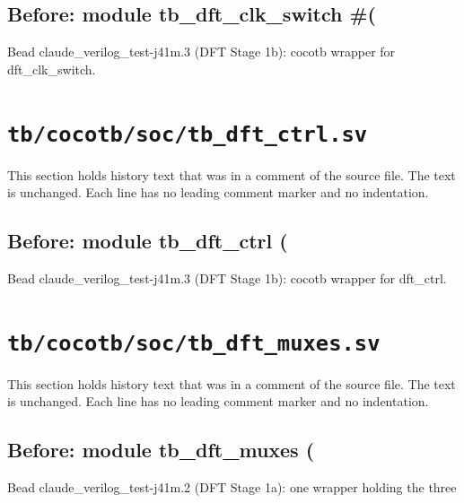 \begin{record}

\subsection*{Before: module tb\_dft\_clk\_switch \#(}

\begin{textblock}
Bead claude_verilog_test-j41m.3 (DFT Stage 1b): cocotb wrapper for dft_clk_switch.
\end{textblock}

\end{record}

\section{\texttt{tb/cocotb/soc/tb\_dft\_ctrl.sv}}\label{cr:suite:soc-tb-dft-ctrl-sv}

This section holds history text that was in a comment of the source file. The text is unchanged. Each line has no leading comment marker and no indentation.

\begin{record}

\subsection*{Before: module tb\_dft\_ctrl (}

\begin{textblock}
Bead claude_verilog_test-j41m.3 (DFT Stage 1b): cocotb wrapper for dft_ctrl.
\end{textblock}

\end{record}

\section{\texttt{tb/cocotb/soc/tb\_dft\_muxes.sv}}\label{cr:suite:soc-tb-dft-muxes-sv}

This section holds history text that was in a comment of the source file. The text is unchanged. Each line has no leading comment marker and no indentation.

\begin{record}

\subsection*{Before: module tb\_dft\_muxes (}

\begin{textblock}
Bead claude_verilog_test-j41m.2 (DFT Stage 1a): one wrapper holding the three
\end{textblock}

\end{record}

